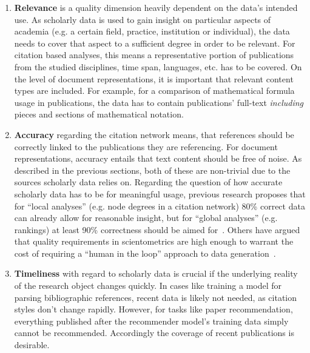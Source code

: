 \begin{enumerate}
    \item \textbf{Relevance} is a quality dimension heavily dependent on the data's intended use. As scholarly data is used to gain insight on particular aspects of academia (e.g. a certain field, practice, institution or individual), the data needs to cover that aspect to a sufficient degree in order to be relevant. For citation based analyses, this means a representative portion of publications from the studied disciplines, time span, languages, etc. has to be covered. On the level of document representations, it is important that relevant content types are included. For example, for a comparison of mathematical formula usage in publications, the data has to contain publications' full-text \emph{including} pieces and sections of mathematical notation.  %
    \item \textbf{Accuracy} regarding the citation network means, that references should be correctly linked to the publications they are referencing. For document representations, accuracy entails that text content should be free of noise. As described in the previous sections, both of these are non-trivial due to the sources scholarly data relies on. Regarding the question of how accurate scholarly data has to be for meaningful usage, previous research proposes that for ``local analyses'' (e.g. node degrees in a citation network) 80\% correct data can already allow for reasonable insight, but for ``global analyses'' (e.g. rankings) at least 90\% correctness should be aimed for~\cite{Strotmann2015}. Others have argued that quality requirements in scientometrics are high enough to warrant the cost of requiring a ``human in the loop'' approach to data generation~\cite{Lauscher2018}.  %
    \item \textbf{Timeliness} with regard to scholarly data is crucial if the underlying reality of the research object changes quickly. In cases like training a model for parsing bibliographic references, recent data is likely not needed, as citation styles don't change rapidly.  However, for tasks like paper recommendation, everything published after the recommender model's training data simply cannot be recommended. Accordingly the coverage of recent publications is desirable.  %

\end{enumerate}
